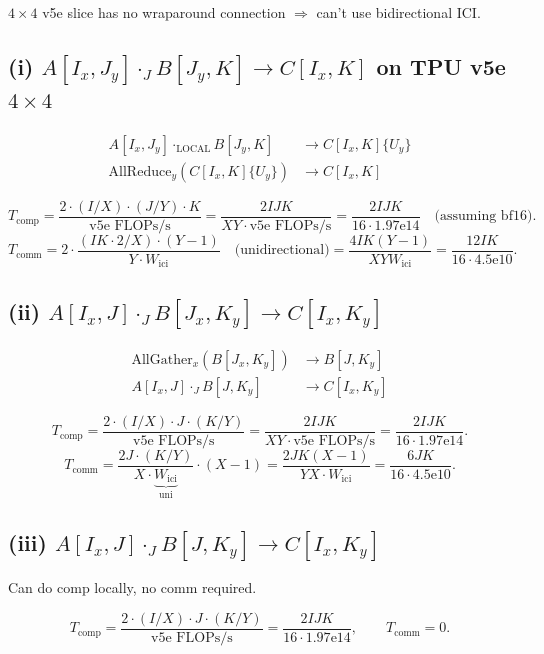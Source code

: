 \documentclass[11pt]{article}
\newcommand{\flopss}{\text{FLOPs/s}}
\newcommand{\Tcomm}{T_{\text{comm}}}
\newcommand{\Tcomp}{T_{\text{comp}}}
\newcommand{\Wici}{W_{\text{ici}}}
\begin{document}
$4 \times 4$ v5e slice has no wraparound connection $\Rightarrow$ can't use bidirectional ICI.

\subsection*{(i) $A[I_x, J_y] \cdot_J B[J_y, K] \to C[I_x, K]$ on TPU v5e $4 \times 4$}

\begin{align*}
A[I_x, J_y] \cdot_{\text{LOCAL}} B[J_y, K] &\to C[I_x, K]\{U_y\} \\
\text{AllReduce}_y(C[I_x, K]\{U_y\}) &\to C[I_x, K]
\end{align*}

\[
\Tcomp = \frac{2 \cdot (I/X) \cdot (J/Y) \cdot K}{\text{v5e }\flopss}
       = \frac{2IJK}{XY \cdot \text{v5e }\flopss}
       = \frac{2IJK}{16 \cdot 1.97\mathrm{e}14} \quad \text{(assuming bf16)}.
\]
\[
\Tcomm = 2 \cdot \frac{(IK \cdot 2 / X) \cdot (Y - 1)}{Y \cdot \Wici} \quad \text{(unidirectional)}
       = \frac{4IK(Y-1)}{XY \Wici} = \frac{12 IK}{16 \cdot 4.5\mathrm{e}10}.
\]

\subsection*{(ii) $A[I_x, J] \cdot_J B[J_x, K_y] \to C[I_x, K_y]$}

\begin{align*}
\text{AllGather}_x(B[J_x, K_y]) &\to B[J, K_y] \\
A[I_x, J] \cdot_J B[J, K_y] &\to C[I_x, K_y]
\end{align*}

\[
\Tcomp = \frac{2 \cdot (I/X) \cdot J \cdot (K/Y)}{\text{v5e }\flopss}
       = \frac{2IJK}{XY \cdot \text{v5e }\flopss}
       = \frac{2IJK}{16 \cdot 1.97\mathrm{e}14}.
\]
\[
\Tcomm = \frac{2J \cdot (K/Y)}{X \cdot \underbrace{\Wici}_{\text{uni}}} \cdot (X-1)
       = \frac{2JK(X-1)}{YX \cdot \Wici} = \frac{6JK}{16 \cdot 4.5\mathrm{e}10}.
\]

\subsection*{(iii) $A[I_x, J] \cdot_J B[J, K_y] \to C[I_x, K_y]$}

Can do comp locally, no comm required.

\[
\Tcomp = \frac{2 \cdot (I/X) \cdot J \cdot (K/Y)}{\text{v5e }\flopss}
       = \frac{2IJK}{16 \cdot 1.97\mathrm{e}14}, \qquad \Tcomm = 0.
\]
\end{document}
